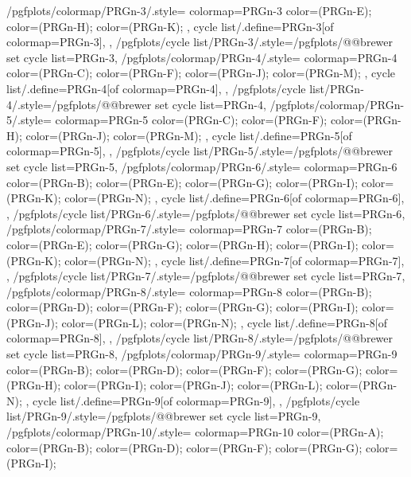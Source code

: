 {  %
  /pgfplots/colormap/PRGn-3/.style={
    colormap={PRGn-3}{
      color=(PRGn-E);
      color=(PRGn-H);
      color=(PRGn-K);
    },
    cycle list/.define={PRGn-3}{[of colormap=PRGn-3]},
  },
  /pgfplots/cycle list/PRGn-3/.style={/pgfplots/@@brewer set cycle list={PRGn-3}},
  /pgfplots/colormap/PRGn-4/.style={
    colormap={PRGn-4}{
      color=(PRGn-C);
      color=(PRGn-F);
      color=(PRGn-J);
      color=(PRGn-M);
    },
    cycle list/.define={PRGn-4}{[of colormap=PRGn-4]},
  },
  /pgfplots/cycle list/PRGn-4/.style={/pgfplots/@@brewer set cycle list={PRGn-4}},
  /pgfplots/colormap/PRGn-5/.style={
    colormap={PRGn-5}{
      color=(PRGn-C);
      color=(PRGn-F);
      color=(PRGn-H);
      color=(PRGn-J);
      color=(PRGn-M);
    },
    cycle list/.define={PRGn-5}{[of colormap=PRGn-5]},
  },
  /pgfplots/cycle list/PRGn-5/.style={/pgfplots/@@brewer set cycle list={PRGn-5}},
  /pgfplots/colormap/PRGn-6/.style={
    colormap={PRGn-6}{
      color=(PRGn-B);
      color=(PRGn-E);
      color=(PRGn-G);
      color=(PRGn-I);
      color=(PRGn-K);
      color=(PRGn-N);
    },
    cycle list/.define={PRGn-6}{[of colormap=PRGn-6]},
  },
  /pgfplots/cycle list/PRGn-6/.style={/pgfplots/@@brewer set cycle list={PRGn-6}},
  /pgfplots/colormap/PRGn-7/.style={
    colormap={PRGn-7}{
      color=(PRGn-B);
      color=(PRGn-E);
      color=(PRGn-G);
      color=(PRGn-H);
      color=(PRGn-I);
      color=(PRGn-K);
      color=(PRGn-N);
    },
    cycle list/.define={PRGn-7}{[of colormap=PRGn-7]},
  },
  /pgfplots/cycle list/PRGn-7/.style={/pgfplots/@@brewer set cycle list={PRGn-7}},
  /pgfplots/colormap/PRGn-8/.style={
    colormap={PRGn-8}{
      color=(PRGn-B);
      color=(PRGn-D);
      color=(PRGn-F);
      color=(PRGn-G);
      color=(PRGn-I);
      color=(PRGn-J);
      color=(PRGn-L);
      color=(PRGn-N);
    },
    cycle list/.define={PRGn-8}{[of colormap=PRGn-8]},
  },
  /pgfplots/cycle list/PRGn-8/.style={/pgfplots/@@brewer set cycle list={PRGn-8}},
  /pgfplots/colormap/PRGn-9/.style={
    colormap={PRGn-9}{
      color=(PRGn-B);
      color=(PRGn-D);
      color=(PRGn-F);
      color=(PRGn-G);
      color=(PRGn-H);
      color=(PRGn-I);
      color=(PRGn-J);
      color=(PRGn-L);
      color=(PRGn-N);
    },
    cycle list/.define={PRGn-9}{[of colormap=PRGn-9]},
  },
  /pgfplots/cycle list/PRGn-9/.style={/pgfplots/@@brewer set cycle list={PRGn-9}},
  /pgfplots/colormap/PRGn-10/.style={
    colormap={PRGn-10}{
      color=(PRGn-A);
      color=(PRGn-B);
      color=(PRGn-D);
      color=(PRGn-F);
      color=(PRGn-G);
      color=(PRGn-I);
}}}
